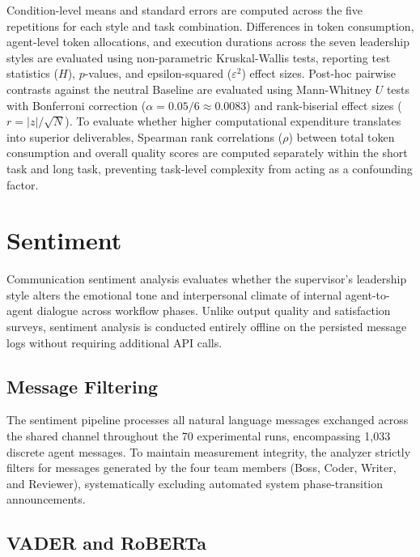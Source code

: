 Condition-level means and standard errors are computed across the five repetitions for each style and task combination.
Differences in token consumption, agent-level token allocations, and execution durations across the seven leadership styles are evaluated using non-parametric Kruskal-Wallis tests, reporting test statistics ($H$), $p$-values, and epsilon-squared ($\varepsilon^2$) effect sizes.
Post-hoc pairwise contrasts against the neutral Baseline are evaluated using Mann-Whitney $U$ tests with Bonferroni correction ($\alpha = 0.05 / 6 \approx 0.0083$) and rank-biserial effect sizes ($r = |z| / \sqrt{N}$).
To evaluate whether higher computational expenditure translates into superior deliverables, Spearman rank correlations ($\rho$) between total token consumption and overall quality scores are computed separately within the short task and long task, preventing task-level complexity from acting as a confounding factor.

\section{Sentiment}
\label{sec:eval-sentiment}

Communication sentiment analysis evaluates whether the supervisor's leadership style alters the emotional tone and interpersonal climate of internal agent-to-agent dialogue across workflow phases.
Unlike output quality and satisfaction surveys, sentiment analysis is conducted entirely offline on the persisted message logs without requiring additional \ac{API} calls.

\subsection{Message Filtering}
\label{subsec:message-filtering}

The sentiment pipeline processes all natural language messages exchanged across the shared channel throughout the 70 experimental runs, encompassing 1,033 discrete agent messages.
To maintain measurement integrity, the analyzer strictly filters for messages generated by the four team members (Boss, Coder, Writer, and Reviewer), systematically excluding automated system phase-transition announcements.

\subsection{VADER and RoBERTa}
\label{subsec:vader-roberta}

